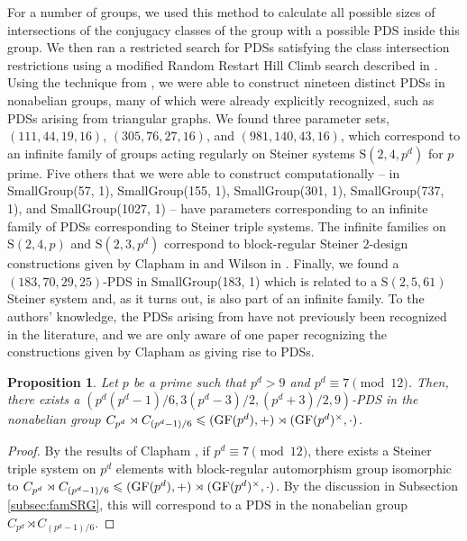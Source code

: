\documentclass[12pt]{amsproc} %
\newtheorem{prop}[thm]{Proposition}
\theoremstyle{definition}\newtheorem{defn}[thm]{Definition}
\theoremstyle{definition}\newtheorem{rem}[thm]{Remark}
\theoremstyle{definition}\newtheorem{ex}[thm]{Example}
\newcommand{\GF}{{\rm GF}}
\renewcommand\le{\leqslant}
\renewcommand{\S}{{\mathrm S}}
\begin{document}
For a number of groups, we used this method to calculate all possible sizes of intersections of the conjugacy classes of the group with a possible PDS inside this group. We then ran a restricted search for PDSs satisfying the class intersection restrictions using a modified Random Restart Hill Climb search described in \cite{brady}. Using the technique from \cite{brady}, we were able to construct nineteen distinct PDSs in nonabelian groups, many of which were already explicitly recognized, such as PDSs arising from triangular graphs. We found three parameter sets, $(111, 44, 19, 16)$, $(305, 76, 27, 16)$, and $(981,140,43,16)$, which correspond to an infinite family of groups acting regularly on Steiner systems $\S(2, 4, p^d)$ for $p$ prime. Five others that we were able to construct computationally -- in SmallGroup(57, 1), SmallGroup(155, 1), SmallGroup(301, 1), SmallGroup(737, 1), and SmallGroup(1027, 1) -- have parameters corresponding to an infinite family of PDSs corresponding to Steiner triple systems. The infinite families on $\S(2, 4, p)$ and $\S(2, 3, p^d)$ correspond to block-regular Steiner $2$-design constructions given by Clapham in \cite{clapham} and Wilson in \cite{wilson}. Finally, we found a $(183,70,29,25)$-PDS in SmallGroup(183, 1) which is related to a $\S(2,5,61)$ Steiner system and, as it turns out, is also part of an infinite family. To the authors' knowledge, the PDSs arising from \cite{wilson} have not previously been recognized in the literature, and we are only aware of one paper \cite{PonomarenkoRyabov_2025} recognizing the constructions given by Clapham \cite{clapham} as giving rise to PDSs.

\begin{prop}\label{Clapham-PDS-family}
Let $p$ be a prime such that $p^d > 9$ and $p^d \equiv 7 \pmod{12}$. Then, there exists a $(p^d(p^d-1)/6, 3(p^d-3)/2, (p^d + 3)/2, 9)$-PDS in the nonabelian group $C_{p^d} \rtimes C_{(p^d-1)/6} \le (\GF(p^d), +) \rtimes (\GF(p^d)^\times, \cdot)$.
\end{prop}

\begin{proof}
 By the results of Clapham \cite[Section 4]{clapham}, if $p^d \equiv 7 \pmod {12}$, there exists a Steiner triple system on $p^d$ elements with block-regular automorphism group isomorphic to $C_{p^d} \rtimes C_{(p^d-1)/6} \le (\GF(p^d), +) \rtimes (\GF(p^d)^\times, \cdot)$. By the discussion in Subsection \ref{subsec:famSRG}, this will correspond to a PDS in the nonabelian group $C_{p^d} \rtimes C_{(p^d-1)/6}$.
\end{proof}
\end{document}
